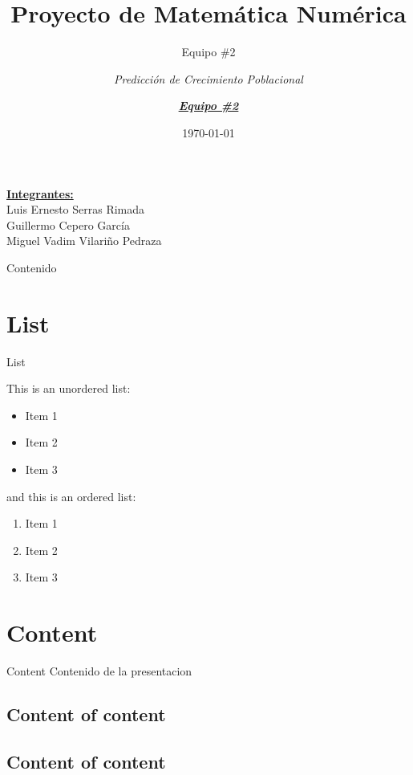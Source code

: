 \documentclass{beamer}
\title{Proyecto de Matemática Numérica}
\subtitle{Equipo \#2}
\author{\textit{Predicción de Crecimiento Poblacional}}
\date{\today}
\begin{document}
\begin{frame}
    \titlepage 
    \underline{\textbf{Integrantes: }}\\
    Luis Ernesto Serras Rimada \\ Guillermo Cepero García \\ Miguel Vadim Vilariño Pedraza
\end{frame}

\logo{}
\author{\textit{\underline{\textbf{Equipo \#2}}}}


\begin{frame}{Contenido}
    \tableofcontents
\end{frame}


\section{List}
\begin{frame}{List}

This is an unordered list:
\begin{itemize}
    \item Item 1
    \item Item 2
    \item Item 3
\end{itemize}

and this is an ordered list:
\begin{enumerate}
    \item Item 1
    \item Item 2
    \item Item 3
\end{enumerate}

\end{frame}

\section{Content}
\begin{frame}{Content}
Contenido de la presentacion
\end{frame}

\subsection{Content of content}
\begin{frame}
\end{frame}

\subsection{Content of content}
\begin{frame}
\end{frame}
\end{document}
